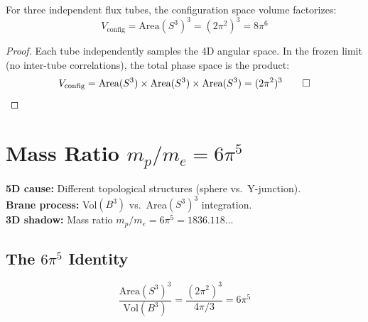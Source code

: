 \begin{theorem}[Factorization]
\label{thm:ch2_factorization}
\tagDc{}
For three independent flux tubes, the configuration space volume factorizes:
\begin{equation}
V_{\text{config}} = \text{Area}(S^3)^3 = (2\pi^2)^3 = 8\pi^6
\label{eq:ch2_factorization}
\end{equation}
\end{theorem}

\begin{proof}
Each tube independently samples the 4D angular space. In the frozen limit
(no inter-tube correlations), the total phase space is the product:
\begin{equation}
V_{\text{config}} = \text{Area}(S^3) \times \text{Area}(S^3) \times \text{Area}(S^3) = (2\pi^2)^3 \qed
\label{eq:ch2_factorization_proof}
\end{equation}
\end{proof}


\section{Mass Ratio $m_p/m_e = 6\pi^5$}
\label{sec:ch2_mass_ratio}

\begin{tcolorbox}[colback=gray!5!white, colframe=gray!50!black,
    title=\textbf{5D Cause → 3D Shadow}]
\textbf{5D cause:} Different topological structures (sphere vs.\ Y-junction).\\
\textbf{Brane process:} Vol$(B^3)$ vs.\ Area$(S^3)^3$ integration.\\
\textbf{3D shadow:} Mass ratio $m_p/m_e = 6\pi^5 = 1836.118...$
\end{tcolorbox}

\subsection{The $6\pi^5$ Identity}

\begin{theorem}[$6\pi^5$ Identity]
\label{thm:ch2_6pi5}
\tagM{}
\begin{equation}
\frac{\text{Area}(S^3)^3}{\text{Vol}(B^3)} = \frac{(2\pi^2)^3}{4\pi/3} = 6\pi^5
\label{eq:ch2_6pi5}
\end{equation}
\end{theorem}

